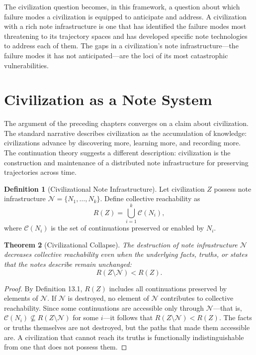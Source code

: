\documentclass[12pt, a4paper]{article}
\theoremstyle{plain}
\newtheorem{theorem}{Theorem}[section]
\theoremstyle{definition}
\newtheorem{definition}[theorem]{Definition}
\theoremstyle{remark}
\begin{document}
The civilization question becomes, in this framework, a question about which
failure modes a civilization is equipped to anticipate and address. A civilization
with a rich note infrastructure is one that has identified the failure modes most
threatening to its trajectory spaces and has developed specific note technologies
to address each of them. The gaps in a civilization's note infrastructure---the
failure modes it has not anticipated---are the loci of its most catastrophic
vulnerabilities.

\section{Civilization as a Note System}

The argument of the preceding chapters converges on a claim about civilization.
The standard narrative describes civilization as the accumulation of knowledge:
civilizations advance by discovering more, learning more, and recording more. The
continuation theory suggests a different description: civilization is the
construction and maintenance of a distributed note infrastructure for preserving
trajectories across time.

\begin{definition}[Civilizational Note Infrastructure]
Let civilization $Z$ possess note infrastructure $\mathcal{N} = \{N_1, \ldots, N_k\}$.
Define collective reachability as
\[
R(Z) = \bigcup_{i=1}^{k} \mathcal{C}(N_i),
\]
where $\mathcal{C}(N_i)$ is the set of continuations preserved or enabled by $N_i$.
\end{definition}

\begin{theorem}[Civilizational Collapse]
The destruction of note infrastructure $\mathcal{N}$ decreases collective
reachability even when the underlying facts, truths, or states that the notes
describe remain unchanged:
\[
R(Z \setminus \mathcal{N}) < R(Z).
\]
\end{theorem}

\begin{proof}
By Definition 13.1, $R(Z)$ includes all continuations preserved by elements of
$\mathcal{N}$. If $\mathcal{N}$ is destroyed, no element of $\mathcal{N}$
contributes to collective reachability. Since some continuations are accessible
only through $\mathcal{N}$---that is, $\mathcal{C}(N_i) \not\subseteq R(Z
\setminus \mathcal{N})$ for some $i$---it follows that $R(Z \setminus \mathcal{N})
< R(Z)$. The facts or truths themselves are not destroyed, but the paths that
made them accessible are. A civilization that cannot reach its truths is
functionally indistinguishable from one that does not possess them.
\end{proof}
\end{document}
